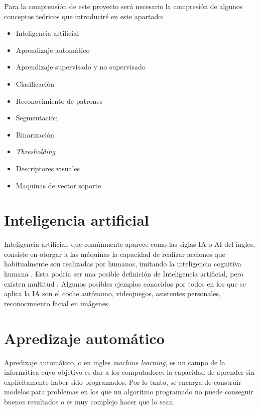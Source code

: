 

Para la comprensión de este proyecto será necesario la compresión de algunos conceptos teóricos que introduciré en este apartado:

\begin{itemize}
	\item Inteligencia artificial
	\item Aprendizaje automático
	\item Aprendizaje supervisado y no supervisado
	\item Clasificación
	\item Reconocimiento de patrones
	\item Segmentación
	\item Binarización
	\item \textit{Thresholding}
	\item Descriptores visuales
	\item Maquinas de vector soporte
\end{itemize}


\section{Inteligencia artificial}

Inteligencia artificial, que comúnmente aparece como las siglas IA o AI del ingles, consiste en otorgar a las máquinas la capacidad de realizar acciones que habitualmente son realizadas por humanos, imitando la inteligencia cognitiva humana \cite{alanturing:ai}. Esta podría ser una posible definición de Inteligencia artificial, pero existen multitud \cite{russell1995modern}. Algunos posibles ejemplos conocidos por todos en los que se aplica la IA son el coche autónomo, videojuegos, asistentes personales, reconocimiento facial en imágenes.

\section{Apredizaje automático}

Apredizaje automático, o en ingles \textit{machine learning}, es un campo de la informática cuyo objetivo es dar a los computadores la capacidad de aprender sin explícitamente haber sido programados\cite{wiki:machinelearning}. Por lo tanto, se encarga de construir modelos para problemas en los que un algoritmo programado no puede conseguir buenos resultados o es muy complejo hacer que lo sean.




